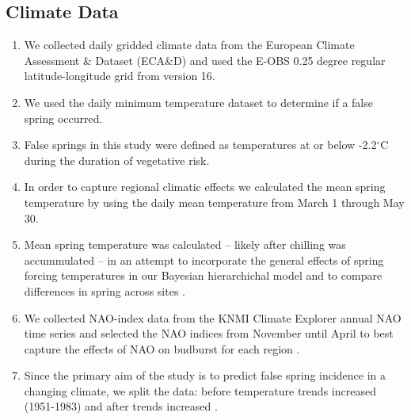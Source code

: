 \documentclass{article}\usepackage[]{graphicx}\usepackage[]{color}
\begin{document}
\subsection*{Climate Data}
\begin{enumerate}
\item We collected daily gridded climate data from the European Climate Assessment \& Dataset (ECA\&D) and used the E-OBS 0.25 degree regular latitude-longitude grid from version 16. 
\item We used the daily minimum temperature dataset to determine if a false spring occurred.
\item False springs in this study were defined as temperatures at or below -2.2$^{\circ}$C \citep{Schwartz1993} during the duration of vegetative risk.
\item In order to capture regional climatic effects we calculated the mean spring temperature by using the daily mean temperature from March 1 through May 30.
\item Mean spring temperature was calculated -- likely after chilling was accummulated -- in an attempt to incorporate the general effects of spring forcing temperatures in our Bayesian hierarchichal model and to compare differences in spring across sites \citep{Basler2012, Korner2016}.
\item We collected NAO-index data from the KNMI Climate Explorer annual NAO time series and selected the NAO indices from November until April to best capture the effects of NAO on budburst for each region \citep{NAO}.
\item Since the primary aim of the study is to predict false spring incidence in a changing climate, we split the data: before temperature trends increased (1951-1983) and after trends increased \citep[1984-2016,][]{Stocker2013, Kharouba2018}.
\end{enumerate}
\end{document}
